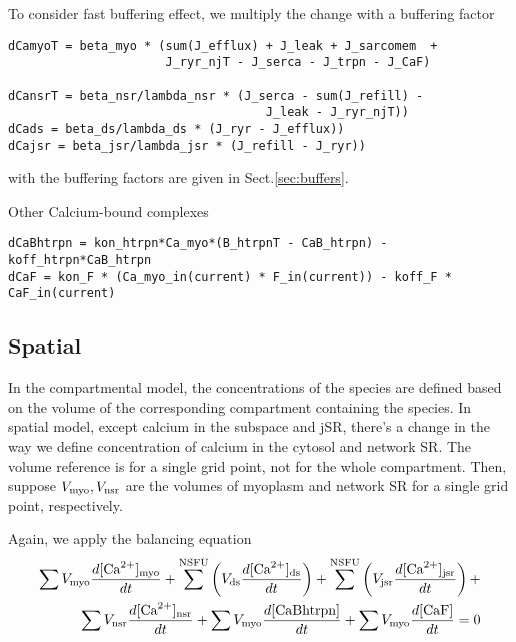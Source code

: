 To consider fast buffering effect, we multiply the change with a buffering
factor
\begin{verbatim}
dCamyoT = beta_myo * (sum(J_efflux) + J_leak + J_sarcomem  + 
                      J_ryr_njT - J_serca - J_trpn - J_CaF) 

dCansrT = beta_nsr/lambda_nsr * (J_serca - sum(J_refill) -
                                    J_leak - J_ryr_njT)) 
dCads = beta_ds/lambda_ds * (J_ryr - J_efflux))
dCajsr = beta_jsr/lambda_jsr * (J_refill - J_ryr))
\end{verbatim}
with the buffering factors are given in Sect.\ref{sec:buffers}.

Other Calcium-bound complexes
\begin{verbatim}
dCaBhtrpn = kon_htrpn*Ca_myo*(B_htrpnT - CaB_htrpn) - koff_htrpn*CaB_htrpn  
dCaF = kon_F * (Ca_myo_in(current) * F_in(current)) - koff_F * CaF_in(current) 
\end{verbatim}

\subsection{Spatial}
\label{sec:balance-eq_spatial}

In the compartmental model, the concentrations of the species are defined based
on the volume of the corresponding compartment containing the species. In
spatial model, except calcium in the subspace and jSR, there's a change in the
way we define concentration of calcium in the cytosol and network SR. The volume
reference is for a single grid point, not for the whole compartment. Then,
suppose $V_{\text{myo}}, V_{\text{nsr}}$ are the volumes of myoplasm and network SR for a single
grid point, respectively.

Again, we apply the balancing equation
\begin{equation}
\begin{split}
 \sum V_{\text{myo}} \frac{d[{\text{Ca}^{2+}}]_{\text{myo}}}{dt} + \sum^{\text{NSFU}} 
  \left(V_{\text{ds}}\frac{d[{\text{Ca}^{2+}}]_{\text{ds}}}{dt}\right) + \sum^{\text{NSFU}}
  \left(V_{\text{jsr}}\frac{d[{\text{Ca}^{2+}}]_{\text{jsr}}}{dt}\right) + \\ 
  \sum V_{\text{nsr}}
  \frac{d[{\text{Ca}^{2+}}]_{\text{nsr}}}{dt} + \sum V_{\text{myo}} \frac{d[{\text{CaBhtrpn}}]}{dt} + \sum V_{\text{myo}}
  \frac{d[\text{CaF}]}{dt} = 0
\end{split}
\end{equation}

